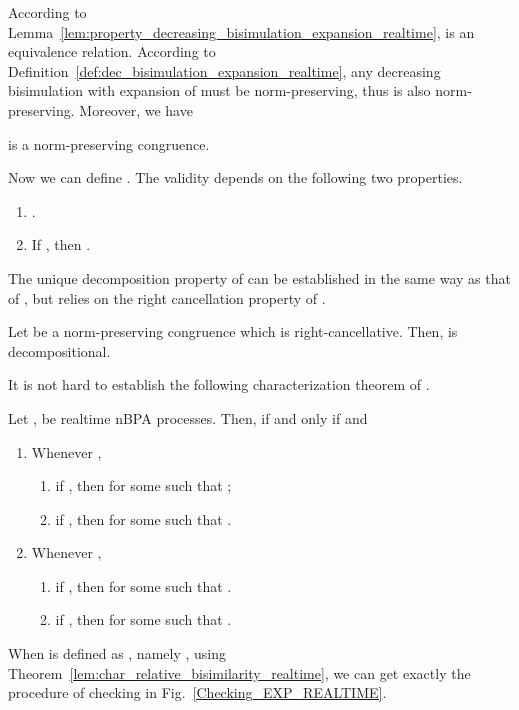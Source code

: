 \documentclass{llncs}
\begin{document}
According to Lemma~\ref{lem:property_decreasing_bisimulation_expansion_realtime},  is an equivalence relation. According to Definition~\ref{def:dec_bisimulation_expansion_realtime}, any decreasing  bisimulation with expansion of  must be norm-preserving, thus  is also norm-preserving.  Moreover, we have

\begin{lemma}
 is a norm-preserving congruence.
\end{lemma}



Now we can define . The validity depends on the following two properties.
\begin{lemma}
\begin{enumerate}
\item
.

\item
If , then .
\end{enumerate}
\end{lemma}

The unique decomposition property of  can be established in the same way as that of , but relies on the right cancellation property of .


\begin{theorem}\label{thm:unique-decomposition-relative-realtime}
Let  be a norm-preserving congruence which is right-cancellative. Then,
 is decompositional.
\end{theorem}



It is not hard to establish the following characterization theorem of .

\begin{theorem}\label{lem:char_relative_bisimilarity_realtime}
Let ,  be realtime nBPA processes.  Then,
 if and only if  and \begin{enumerate}
\item
Whenever ,
\begin{enumerate}
\item
if  ,
then
 for some  such that ;

\item
if  ,
then
 for some  such that .
\end{enumerate}

\item
Whenever ,
\begin{enumerate}
\item
if ,
then
 for some  such that .

\item
if ,
then
 for some  such that .
\end{enumerate}
\end{enumerate}
\end{theorem}
When  is defined as , namely , using Theorem~\ref{lem:char_relative_bisimilarity_realtime}, we can get exactly the procedure of checking  in Fig.~\ref{Checking_EXP_REALTIME}.
\end{document}
